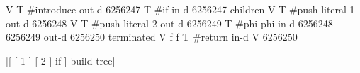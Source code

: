 \centering

  \begin{factorcode}
    V{
        T{ #introduce { out-d { 6256247 } } }
        T{ #if
            { in-d { 6256247 } }
            { children
                {
                    V{
                        T{ #push
                            { literal 1 }
                            { out-d { 6256248 } }
                        }
                    }
                    V{
                        T{ #push
                            { literal 2 }
                            { out-d { 6256249 } }
                        }
                    }
                }
            }
        }
        T{ #phi
            { phi-in-d { { 6256248 } { 6256249 } } }
            { out-d { 6256250 } }
            { terminated V{ f f } }
        }
        T{ #return { in-d V{ 6256250 } } }
    }
  \end{factorcode}

\caption{\factor|[ [ 1 ] [ 2 ] if ] build-tree|}

